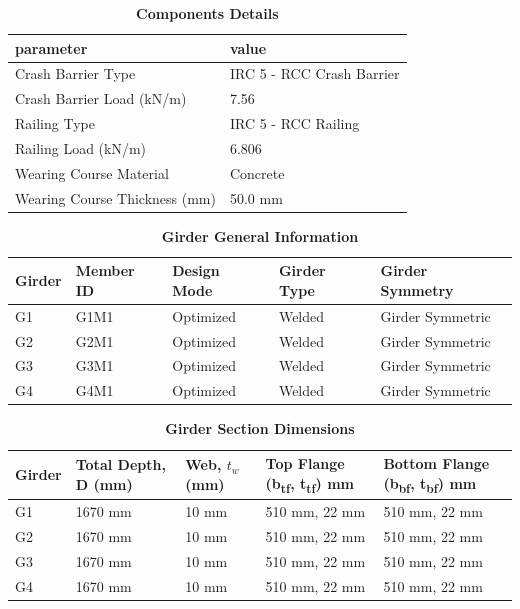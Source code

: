 \documentclass[12pt,a4paper]{report}
\numberwithin{table}{chapter}
\numberwithin{figure}{chapter}
\begin{document}
\begin{longtable}{|L{5.5cm}|p{10.0cm}|}
\caption{\textbf{Components Details}}\\
\hline
\textbf{parameter} & \textbf{value} \\
\hline
\textnormal{Crash Barrier Type} & IRC 5 - RCC Crash Barrier \\[6pt]
\hline
\textnormal{Crash Barrier Load (kN/m)} & 7.56 \\[6pt]
\hline

\textnormal{Railing Type} & IRC 5 - RCC Railing \\[6pt]
\hline
\textnormal{Railing Load (kN/m)} & 6.806 \\[6pt]
\hline
\textnormal{Wearing Course Material} & Concrete \\[6pt]
\hline
\textnormal{Wearing Course Thickness (mm)} & 50.0 mm \\[6pt]
\hline
\end{longtable}


\newpage

\vspace{0.4em}
\noindent

\vspace{4pt}
\begin{longtable}{|L{2.2cm}|L{1.8cm}|p{3.8cm}|p{3.8cm}|p{3.8cm}|}
\caption{\textbf{Girder General Information}}\\
\hline
\textbf{Girder} & \textbf{Member ID} & \textbf{Design Mode} & \textbf{Girder Type} & \textbf{Girder Symmetry} \\[6pt]
\hline
G1 & G1M1 & Optimized & Welded & Girder Symmetric \\[8pt]
\hline
G2 & G2M1 & Optimized & Welded & Girder Symmetric \\[8pt]
\hline
G3 & G3M1 & Optimized & Welded & Girder Symmetric \\[8pt]
\hline
G4 & G4M1 & Optimized & Welded & Girder Symmetric \\[8pt]
\hline
\end{longtable}

\vspace{0.6em}

\vspace{4pt}
\begin{longtable}{|L{1.8cm}|L{2.3cm}|L{1.8cm}|p{4.8cm}|p{4.8cm}|}
\caption{\textbf{Girder Section Dimensions}}\\
\hline
\textbf{Girder} & \textbf{Total Depth, D (mm)} & \textbf{Web, $t_w$ (mm)} & \textbf{Top Flange (b\textsubscript{tf}, t\textsubscript{tf}) mm} & \textbf{Bottom Flange (b\textsubscript{bf}, t\textsubscript{bf}) mm} \\[6pt]
\hline
G1 & 1670 mm & 10 mm & 510 mm, 22 mm & 510 mm, 22 mm \\[8pt]
\hline
G2 & 1670 mm & 10 mm & 510 mm, 22 mm & 510 mm, 22 mm \\[8pt]
\hline
G3 & 1670 mm & 10 mm & 510 mm, 22 mm & 510 mm, 22 mm \\[8pt]
\hline
G4 & 1670 mm & 10 mm & 510 mm, 22 mm & 510 mm, 22 mm \\[8pt]
\hline
\end{longtable}
\end{document}
